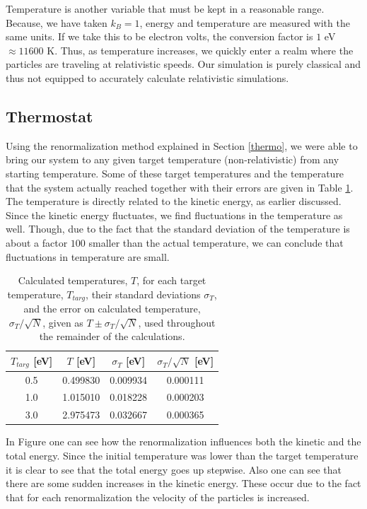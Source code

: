 \documentclass{article}
\begin{document}
\begin{multicols}{2}
Temperature is another variable that must be kept in a reasonable range.  Because, we have taken $k_B =1$, energy and temperature are measured with the same units.  If we take this to be electron volts, the conversion factor is $1 $ eV $\approx 11600$ K.  Thus, as temperature increases, we quickly enter a realm where the particles are traveling at relativistic speeds.  Our simulation is purely classical and thus not equipped to accurately calculate relativistic simulations.

\subsection{Thermostat}

Using the renormalization method explained in Section \ref{thermo}, we were able to bring our system to any given target temperature (non-relativistic) from any starting temperature.  Some of these target temperatures and the temperature that the system actually reached together with their errors are given in Table \ref{temptable}. The temperature is directly related to the kinetic energy, as earlier discussed. Since the kinetic energy fluctuates, we find fluctuations in the temperature as well. Though, due to the fact that the standard deviation of the temperature is about a factor $100$ smaller than the actual temperature, we can conclude that fluctuations in temperature are small. \\

\begin{table}
\begin{center}
\begin{tabular}{| c | c | c | c |}
\hline $T_{targ}$ [eV] & $T$ [eV] & $\sigma_T$ [eV] & $\sigma_T/\sqrt{N}$ [eV] \\ \hline
 0.5 & 0.499830 & 0.009934 & 0.000111 \\ \hline
1.0 & 1.015010 & 0.018228 & 0.000203  \\ \hline
3.0 & 2.975473 & 0.032667 & 0.000365 \\ \hline
\end{tabular}
\label{temptable}
\caption{Calculated temperatures, $T$, for each target temperature, $T_{targ}$, their standard deviations $\sigma _T$, and the error on calculated temperature, $\sigma _T/\sqrt{N}$, given as $T \pm \sigma_T /\sqrt{N}$, used throughout the remainder of the calculations.}
\end{center}
\end{table}

In Figure \label{engrenbrm} one can see how the renormalization influences both the kinetic and the total energy. Since the initial temperature was lower than the target temperature it is clear to see that the total energy goes up stepwise. Also one can see that there are some sudden increases in the kinetic energy. These occur due to the fact that for each renormalization the velocity of the particles is increased. 


\end{multicols}
\end{document}
